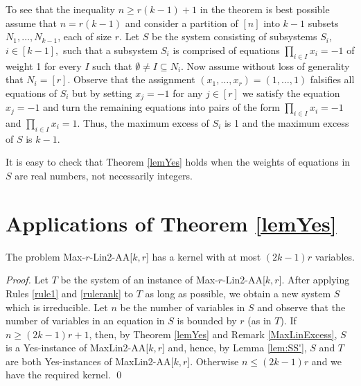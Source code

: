 \documentclass{llncs}
\begin{document}
\begin{remark}\label{rem:sharp2}
To see that the inequality $n \ge r(k-1)+1$ in the theorem is best possible assume that $n=r(k-1)$ and
consider a partition of $[n]$ into $k-1$ subsets $N_1,\ldots ,N_{k-1}$, each of size $r.$
Let $S$ be the system consisting of subsystems $S_i$, $i\in [k-1],$ such that a subsystem $S_i$ is comprised of equations $\prod_{i \in I} x_i=-1$ of weight 1 for every $I$ such that $\emptyset \neq I\subseteq N_i$. Now assume without loss of generality that $N_i=[r]$. Observe that the assignment $(x_1,\ldots ,x_r)=(1,\ldots ,1)$ falsifies all equations of $S_i$ but by setting $x_j=-1$ for any $j\in [r]$ we satisfy the equation $x_j=-1$ and turn the remaining equations into pairs of the form $\prod_{i \in I} x_i=-1$ and $\prod_{i \in I} x_i=1$. Thus, the maximum excess of $S_i$ is 1 and the maximum excess of $S$ is $k-1$.
\end{remark}

\begin{remark}\label{rem:reals}
It is easy to check that Theorem \ref{lemYes} holds when the weights of equations in $S$ are real
numbers, not necessarily integers.
\end{remark}


\section{Applications of Theorem \ref{lemYes}}\label{sec:PBEE}

\begin{theorem}\label{thLinAAkr}
The problem {\sc Max-$r$-Lin2-AA}[$k,r$] has a kernel with at most $(2k-1)r$ variables.
\end{theorem}

\begin{proof}

Let $T$ be the system of an instance of {\sc Max-$r$-Lin2-AA}[$k,r$]. After applying Rules \ref{rule1} and  \ref{rulerank}  to $T$ as long as possible, we obtain a new system $S$ which is irreducible. Let $n$ be the number of variables in $S$ and observe that the number of variables in an equation in $S$ is bounded by $r$ (as in $T$). If $n \ge (2k-1)r+1$, then, by Theorem \ref{lemYes} and Remark \ref{MaxLinExcess}, $S$ is a {\sc Yes}-instance of {\sc MaxLin2-AA}[$k,r$] and, hence, by Lemma \ref{lem:SS'}, $S$ and $T$ are both {\sc Yes}-instances of {\sc MaxLin2-AA}[$k,r$].
Otherwise $n \le (2k-1)r$ and we have the required kernel.
\qed \end{proof}
\end{document}
